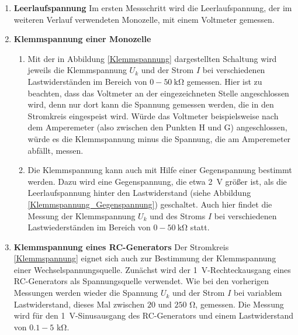 \begin{enumerate}
\item \textbf{Leerlaufspannung} Im ersten Messschritt wird die Leerlaufspannung, der im weiteren Verlauf verwendeten Monozelle, mit einem Voltmeter gemessen.
\item \textbf{Klemmspannung einer Monozelle}
\begin{enumerate}[label=\alph*)]
	\item Mit der in Abbildung \ref{Klemmspannung} dargestellten Schaltung wird jeweils die Klemmspannung $U_k$ und der Strom $I$ bei verschiedenen Lastwiderständen im Bereich von $0-50\ \si{\kilo\ohm}$ gemessen. Hier ist zu beachten, dass das Voltmeter an der eingezeichneten Stelle angeschlossen wird, denn nur dort kann die Spannung gemessen werden, die in den Stromkreis eingespeist wird. Würde das Voltmeter beispielsweise nach dem Amperemeter (also zwischen den Punkten H und G) angeschlossen, würde es die Klemmspannung minus die Spannung, die am Amperemeter abfällt, messen.
	\item Die Klemmspannung kann auch mit Hilfe einer Gegenspannung bestimmt werden. Dazu wird eine Gegenspannung, die etwa \SI{2}{\volt} größer ist, als die Leerlaufspannung hinter den Lastwiderstand (siehe Abbildung \ref{Klemmspannung_Gegenspannung}) geschaltet. Auch hier findet die Messung der Klemmspannung $U_k$ und des Stroms $I$ bei verschiedenen Lastwiederständen im Bereich von $0-50\ \si{\kilo\ohm}$ statt.
\end{enumerate}

\item \textbf{Klemmspannung eines RC-Generators} Der Stromkreis \ref{Klemmspannung} eignet sich auch zur Bestimmung der Klemmspannung einer Wechselspannungsquelle. Zunächst wird der \SI{1}{\volt}-Rechteckausgang eines RC-Generators als Spannungsquelle verwendet. Wie bei den vorherigen Messungen werden wieder die Spannung $U_k$ und der Strom $I$ bei variablem Lastwiderstand, dieses Mal zwischen $20$ und $250$ \si{\ohm}, gemessen. Die Messung wird für den \SI{1}{\volt}-Sinusausgang des RC-Generators und einem Lastwiderstand von $0.1-5$ \si{\kilo\ohm}.
\end{enumerate}
